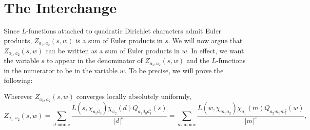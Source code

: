 \documentclass[12pt,reqno,oneside]{amsart}
\begin{document}
\section{The Interchange}
    Since $L$-functions attached to quadratic Dirichlet characters admit Euler products, $Z_{a_{1},a_{2}}(s,w)$ is a sum of Euler products in $s$. We will now argue that $Z_{a_{1},a_{2}}(s,w)$ can be written as a sum of Euler products in $w$. In effect, we want the variable $s$ to appear in the denominator of $Z_{a_{1},a_{2}}(s,w)$ and the $L$-functions in the numerator to be in the variable $w$. To be precise, we will prove the following:

    \begin{theorem}
        Wherever $Z_{a_{1},a_{2}}(s,w)$ converges locally absolutely uniformly,
        \[
            Z_{a_{1},a_{2}}(s,w) = \sum_{\text{$d$ monic}}\frac{L(s,\chi_{a_{1}d_{0}})\chi_{a_{2}}(d)Q_{a_{1}d_{0}d_{1}^{2}}(s)}{|d|^{w}} = \sum_{\text{$m$ monic}}\frac{L(w,\chi_{m_{0}a_{2}})\chi_{a_{1}}(m)Q_{a_{2}m_{0}m_{1}^{2}}(w)}{|m|^{s}},
        \]
    \end{theorem}
\end{document}
